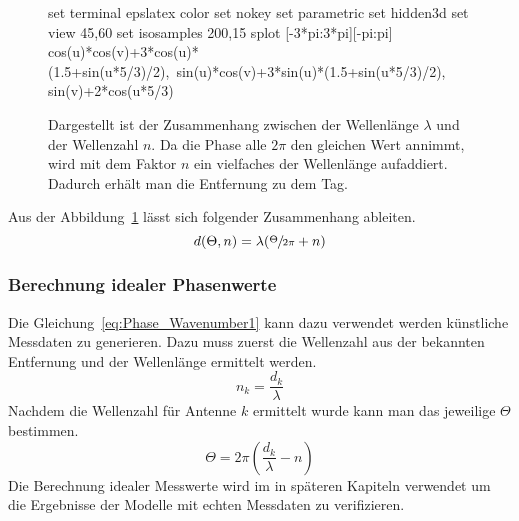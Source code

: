 \begin{figure}[h!]
	\caption[Zusammenhang Wellenlänge - Wellenzahl]{Dargestellt ist der Zusammenhang zwischen der Wellenlänge $\lambda$ und der Wellenzahl $n$. Da die Phase alle $2\pi$ den gleichen Wert annimmt, wird mit dem Faktor $n$ ein vielfaches der Wellenlänge aufaddiert. Dadurch erhält man die Entfernung zu dem Tag.}
	\label{fig:wavenumber_wavelength}
	\begin{gnuplot} %
		set terminal epslatex color %
		set nokey %
		set parametric
		set hidden3d
		set view 45,60
		set isosamples 200,15
		splot [-3*pi:3*pi][-pi:pi] cos(u)*cos(v)+3*cos(u)*(1.5+sin(u*5/3)/2),\
		sin(u)*cos(v)+3*sin(u)*(1.5+sin(u*5/3)/2), sin(v)+2*cos(u*5/3)
	\end{gnuplot}	
%	
%	
\end{figure}


Aus der Abbildung~\ref{fig:wavenumber_wavelength} lässt sich folgender Zusammenhang ableiten.
%
\begin{equation}
	\label{eq:Phase_Wavenumber1}
	d(\Theta, n)=\lambda(\sfrac{\Theta}{2\pi}+n)
\end{equation}
%
\subsubsection{Berechnung idealer Phasenwerte}
\label{sec:PhaseCalculation}
%
Die Gleichung~\ref{eq:Phase_Wavenumber1} kann dazu verwendet werden künstliche Messdaten zu generieren. Dazu muss zuerst die Wellenzahl aus der bekannten Entfernung und der Wellenlänge ermittelt werden.
$$
n_k=\frac{d_k}{\lambda}
$$
Nachdem die Wellenzahl für Antenne $k$ ermittelt wurde kann man das jeweilige $\Theta$ bestimmen.
$$
\Theta= 2\pi(\frac{d_k }{\lambda}-n)
$$
%
Die Berechnung idealer Messwerte wird im in späteren Kapiteln verwendet um die Ergebnisse der Modelle mit echten Messdaten zu verifizieren.